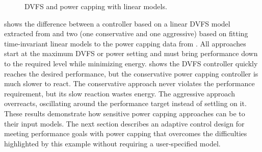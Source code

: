 \begin{figure}
  \centering
  
  \caption{DVFS and power capping with linear models.}
  \label{fig:copper-vips-example}
\end{figure}

 shows the difference between a controller based on a linear DVFS model extracted from  and two (one conservative and one aggressive) based on fitting time-invariant linear models to the power capping data from .
All approaches start at the maximum DVFS or power setting and must bring performance down to the required level while minimizing energy.
 shows the DVFS controller quickly reaches the desired performance, but the conservative power capping controller is much slower to react.
The conservative approach never violates the performance requirement, but its slow reaction wastes energy.
The aggressive approach overreacts, oscillating around the performance target instead of settling on it.
These results demonstrate how sensitive power capping approaches can be to their input models.
The next section describes an adaptive control design for meeting performance goals with power capping that overcomes the difficulties highlighted by this example without requiring a user-specified model.
